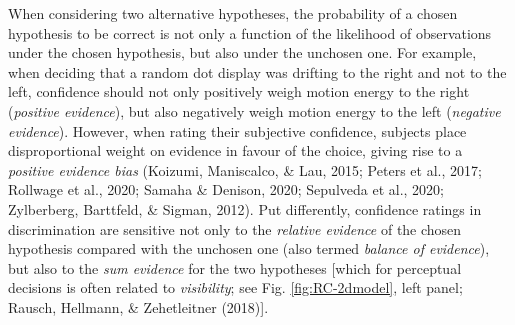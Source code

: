 \documentclass[12pt,twoside]{reedthesis}
\begin{document}
When considering two alternative hypotheses, the probability of a chosen hypothesis to be correct is not only a function of the likelihood of observations under the chosen hypothesis, but also under the unchosen one. For example, when deciding that a random dot display was drifting to the right and not to the left, confidence should not only positively weigh motion energy to the right (\emph{positive evidence}), but also negatively weigh motion energy to the left (\emph{negative evidence}). However, when rating their subjective confidence, subjects place disproportional weight on evidence in favour of the choice, giving rise to a \emph{positive evidence bias} (Koizumi, Maniscalco, \& Lau, 2015; Peters et al., 2017; Rollwage et al., 2020; Samaha \& Denison, 2020; Sepulveda et al., 2020; Zylberberg, Barttfeld, \& Sigman, 2012). Put differently, confidence ratings in discrimination are sensitive not only to the \emph{relative evidence} of the chosen hypothesis compared with the unchosen one (also termed \emph{balance of evidence}), but also to the \emph{sum evidence} for the two hypotheses {[}which for perceptual decisions is often related to \emph{visibility}; see Fig. \ref{fig:RC-2dmodel}, left panel; Rausch, Hellmann, \& Zehetleitner (2018){]}.
\end{document}
